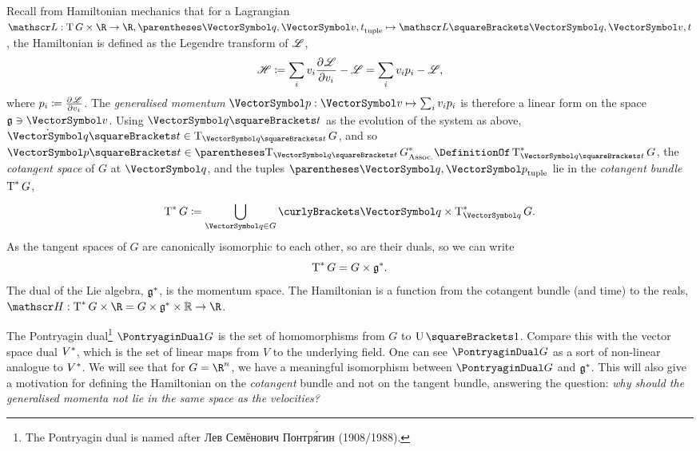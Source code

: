 \documentclass[10pt, a4paper, twoside]{lecturenotes}
\newcommand{\Rn}{{\R^n}}
\begin{document}
\begin{supplemental}
Recall from Hamiltonian mechanics that for a Lagrangian
$\FunctionSpec \Lagrangian {\TangentBundle G \Cartesian \R}{\R}, \FunctionBody {\tuple{\vq,\vv,t}} {\Lagrangian\of{\vq,\vv,t}}$,
the Hamiltonian is defined as the Legendre transform of $\mathscr{L}$,
\begin{equation*}
\Hamiltonian \DefineAs \sum i v_i \pderiv{v_i}\Lagrangian - \Lagrangian = \sum i v_i p_i - \Lagrangian\text{,}
\end{equation*}
where $p_i \coloneq \frac{\partial^{} \mathscr{L}}{{\partial {v_i}}^{}}$. The \emph{generalised momentum} $\FunctionNamedBody\vp \vv {\sum i v_i p_i}$ is therefore a linear form on the space $\VelocitySpace\owns\vv$. Using $\vq\of t$ as the evolution of the system as above, $\TimeDerivative\vq\of t \in \TangentSpace{\vq\of t}G$, and so $\vp\of t\in \Dual{\pa{\TangentSpace{\vq\of t}G}} \DefinitionOf \CotangentSpace{\vq\of t}G$, the \emph{cotangent space} of $G$ at $\vq$, and the tuples $\tuple{\vq,\vp}$ lie in the \emph{cotangent bundle} $\operatorname{T}^*{G}$,
\begin{equation*}
\CotangentBundle G \DefineAs \UnionOver{\vq\in G}\set\vq \Cartesian \CotangentSpace\vq G\text{.}
\end{equation*}
As the tangent spaces of $G$ are canonically isomorphic to each other, so are their duals, so we can write
\begin{equation*}
\operatorname{T}^*{G} = G \times \mathfrak{g}^*\text{.}
\end{equation*}
The dual of the Lie algebra, $\mathfrak{g}^*$, is the momentum space. The Hamiltonian is a function from the cotangent bundle (and time) to the reals, $\FunctionSpec\Hamiltonian {\CotangentBundle G \Cartesian \R = G \Cartesian \MomentumSpace \Cartesian \Reals} \R$.

The Pontryagin dual\footnote{The Pontryagin dual is named after %
\textrussian{Лев Семёнович Понтря́гин} (1908{\slash}1988).} $\PontryaginDual G$ is the set of homomorphisms from $G$ to $\UnitaryGroup\of 1$. Compare this with the vector space dual $V^*$, which is the set of linear maps from $V$ to the underlying field. One can see $\PontryaginDual G$ as a sort of non-linear analogue to $V^*$. We will see that for $G=\Rn$, we have a meaningful isomorphism between $\PontryaginDual G$ and $\mathfrak{g}^*$. This will also give a motivation for defining the Hamiltonian on the \emph{cotangent} bundle and not on the tangent bundle, answering the question: \emph{why should the generalised momenta not lie in the same space as the velocities?}
\endgroup
\end{supplemental}
\end{document}
